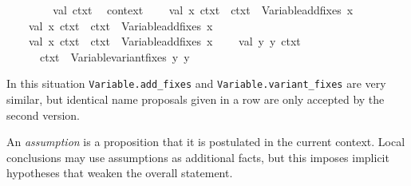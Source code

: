 \begin{isabellebody}
\isamarkupfalse%
\isanewline
%
\isadelimML
\ \ %
\endisadelimML
%
\isatagML
{}\isamarkupfalse%
\ {\isacharverbatimopen}\isanewline
\ \ \ \ val\ ctxt{}\ {\isacharequal}\ %
\isaantiq
context%
\endisaantiq
{\isacharsemicolon}\isanewline
\isanewline
\ \ \ \ val\ {\isacharparenleft}{\isacharbrackleft}x{}{\isacharbrackright}{\isacharcomma}\ ctxt{}{\isacharparenright}\ {\isacharequal}\ ctxt{}\ {\isacharbar}{\isachargreater}\ Variable{\isachardot}add{\isacharunderscore}fixes\ {\isacharbrackleft}{\isachardoublequote}x{\isachardoublequote}{\isacharbrackright}{\isacharsemicolon}\isanewline
\ \ \ \ val\ {\isacharparenleft}{\isacharbrackleft}x{}{\isacharbrackright}{\isacharcomma}\ ctxt{}{\isacharparenright}\ {\isacharequal}\ ctxt{}\ {\isacharbar}{\isachargreater}\ Variable{\isachardot}add{\isacharunderscore}fixes\ {\isacharbrackleft}{\isachardoublequote}x{\isachardoublequote}{\isacharbrackright}{\isacharsemicolon}\isanewline
\ \ \ \ val\ {\isacharparenleft}{\isacharbrackleft}x{}{\isacharbrackright}{\isacharcomma}\ ctxt{}{\isacharparenright}\ {\isacharequal}\ ctxt{}\ {\isacharbar}{\isachargreater}\ Variable{\isachardot}add{\isacharunderscore}fixes\ {\isacharbrackleft}{\isachardoublequote}x{\isachardoublequote}{\isacharbrackright}{\isacharsemicolon}\isanewline
\isanewline
\ \ \ \ val\ {\isacharparenleft}{\isacharbrackleft}y{}{\isacharcomma}\ y{}{\isacharbrackright}{\isacharcomma}\ ctxt{}{\isacharparenright}\ {\isacharequal}\isanewline
\ \ \ \ \ \ ctxt{}\ {\isacharbar}{\isachargreater}\ Variable{\isachardot}variant{\isacharunderscore}fixes\ {\isacharbrackleft}{\isachardoublequote}y{\isachardoublequote}{\isacharcomma}\ {\isachardoublequote}y{\isachardoublequote}{\isacharbrackright}{\isacharsemicolon}\isanewline
\ \ {\isacharverbatimclose}\isanewline
\ \ \isamarkupfalse%
%
\endisatagML
{\isafoldML}%
%
\isadelimML
%
\endisadelimML
%
\begin{isamarkuptext}%
In this situation \verb|Variable.add_fixes| and \verb|Variable.variant_fixes| are very similar, but identical name
  proposals given in a row are only accepted by the second version.%
\end{isamarkuptext}%
\isamarkuptrue%
%
\isamarkuptrue%
%
\begin{isamarkuptext}%
An \emph{assumption} is a proposition that it is postulated in the
  current context.  Local conclusions may use assumptions as
  additional facts, but this imposes implicit hypotheses that weaken
  the overall statement.


\end{isamarkuptext}
\end{isabellebody}
